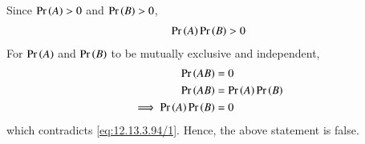 Since $\Pr\left(A\right)>0$ and $\Pr\left(B\right)>0$, 
\begin{align}
\label{eq:12.13.3.94/1}\pr{A}\pr{B}>0
\end{align}
For $\Pr\left(A\right)$ and $\Pr\left(B\right)$ to be mutually exclusive and independent,  
\begin{align}
\label{eq:12.13.3.94/2} \pr{AB}&=0  \\
\label{eq:12.13.3.94/3} \pr{AB}&=\pr{A}\pr{B} \\ 
\implies \label{eq:12.13.3.94/4}\pr{A}\pr{B}&=0
\end{align}
which 
contradicts \eqref{eq:12.13.3.94/1}.
Hence, the above statement is false.
